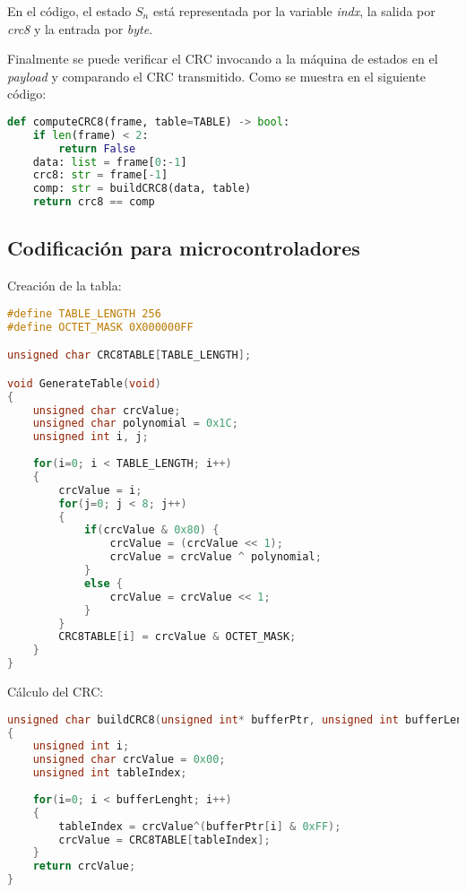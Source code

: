 \documentclass[
12pt,
spanish,
singlespacing,
parskip,
headsepline]{article}
\begin{document}
En el código, el estado $S_n$ está representada por la variable \emph{indx}, la salida por \emph{crc8} y la entrada por \emph{byte}.

Finalmente se puede verificar el CRC invocando a la máquina de estados en el \emph{payload} y comparando el CRC transmitido.
Como se muestra en el siguiente código:

\begin{lstlisting}[language=Python]
def computeCRC8(frame, table=TABLE) -> bool:
	if len(frame) < 2:
		return False
	data: list = frame[0:-1]
	crc8: str = frame[-1]
	comp: str = buildCRC8(data, table)
	return crc8 == comp
\end{lstlisting}

\subsection{Codificación para microcontroladores}
\label{sub:langc}

Creación de la tabla:

\begin{lstlisting}[language=C]
#define TABLE_LENGTH 256
#define OCTET_MASK 0X000000FF

unsigned char CRC8TABLE[TABLE_LENGTH];

void GenerateTable(void)
{
	unsigned char crcValue;
	unsigned char polynomial = 0x1C;
	unsigned int i, j;
	
	for(i=0; i < TABLE_LENGTH; i++)
	{
		crcValue = i;
		for(j=0; j < 8; j++)
		{
			if(crcValue & 0x80) {
				crcValue = (crcValue << 1);
				crcValue = crcValue ^ polynomial;
			}
			else {
				crcValue = crcValue << 1;
			}
		}
		CRC8TABLE[i] = crcValue & OCTET_MASK;
	}
}
\end{lstlisting}

Cálculo del CRC:

\begin{lstlisting}[language=C]
unsigned char buildCRC8(unsigned int* bufferPtr, unsigned int bufferLenght)
{
	unsigned int i;
	unsigned char crcValue = 0x00;
	unsigned int tableIndex;
	
	for(i=0; i < bufferLenght; i++)
	{
		tableIndex = crcValue^(bufferPtr[i] & 0xFF);
		crcValue = CRC8TABLE[tableIndex];
	}
	return crcValue;
}

\end{lstlisting}
\end{document}
